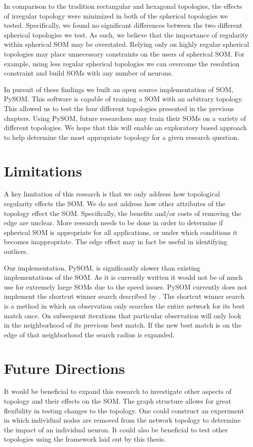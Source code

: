 In comparison to the tradition rectangular and hexagonal topologies, the effects
of irregular topology were minimized in both of the spherical
topologies we tested.  Specifically, we found no significant differences
between the two different spherical topologies we test.  As such, we believe
that the importance of regularity within spherical SOM may be overstated.
Relying only on highly regular spherical topologies may place
unnecessary constraints on the users of spherical SOM.  For example, using less
regular spherical topologies we can overcome the resolution constraint and build
SOMs with any number of neurons.

In pursuit of these findings we built an open source implementation of SOM,
PySOM. This software is capable of training a SOM with an arbitrary
topology.  This allowed us to test the four different topologies presented in
the previous chapters.  Using PySOM, future researchers may train their
SOMs on a variety of different topologies.  We hope that this will enable an
exploratory based approach to help determine the most appropriate topology for
a given research question.


\section{Limitations}
A key limitation of this research is that we only address how topological
regularity effects the SOM.  We do not address how other attributes of the
topology effect the SOM. Specifically, the benefits and/or costs of removing the
edge are unclear.  More research needs to be done in order to determine if spherical SOM
is appropriate for all applications, or under which conditions it becomes
inappropriate.  The edge effect may in fact be useful in identifying outliers.

Our implementation, PySOM, is significantly slower than existing implementations
of the SOM.  As it is currently written it would not be of much use for
extremely large SOMs due to the speed issues.  PySOM currently does not
implement the shortcut winner search described by \cite{Kohonen2000}.  The
shortcut winner search is a method in which an observation only searches the entire
network for its best match once.  On subsequent iterations that particular
observation will only look in the neighborhood of its previous best match. If
the new best match is on the edge of that neighborhood the search radius is
expanded.


\section{Future Directions}
It would be beneficial to expand this research to investigate other aspects of
topology and their effects on the SOM.  The graph structure allows for great
flexibility in testing changes to the topology.  One could construct an
experiment in which individual nodes are removed from the network topology to
determine the impact of an individual neuron.  It could also be beneficial to
test other topologies using the framework laid out by this thesis.

